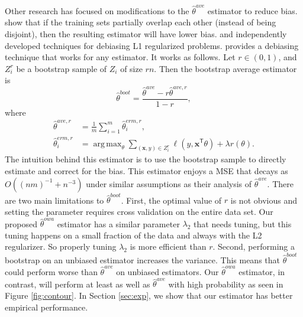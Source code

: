 \documentclass[twoside]{article}
\DeclareMathOperator*{\argmin}{arg\,min}
\DeclareMathOperator*{\argmax}{arg\,max}
\newcommand{\x}{\mathbf{x}}
\newcommand{\w}{\theta}
\newcommand{\wowa}{\hat\w^{owa}}
\newcommand{\wave}{\hat\w^{ave}}
\newcommand{\waver}{\hat\w^{ave,r}}
\newcommand{\wboot}{\hat\w^{boot}}
\newcommand{\wmle}{\hat\w^{erm}}
\newcommand{\wmler}{\hat\w^{erm,r}}
\newcommand{\reg}{r}
\newcommand{\loss}{\ell}
\newcommand{\trans}[1]{\ensuremath{{#1}^{\mathsf{T}}}}
\newcommand{\ltwo}[1]{{\lVert {#1} \rVert}}
\begin{document}
Other research has focused on modifications to the $\wave$ estimator to reduce bias.
\citet{zinkevich2010parallelized} show that if the training sets partially overlap each other (instead of being disjoint), then the resulting estimator will have lower bias.
\citet{lee2015communication} and \citet{battey2015distributed} independently developed techniques for debiasing L1 regularized problems.
\citet{zhang2012communication} provides a debiasing technique that works for any estimator.
It works as follows.
Let $r\in(0,1)$, and $Z_i^r$ be a bootstrap sample of $Z_i$ of size $rn$.
Then the bootstrap average estimator is
\begin{equation}
\wboot = \frac{\wave-r\waver}{1-r}
,
\end{equation}
where
\begin{equation}
\begin{aligned}
\waver &= \frac{1}{m}\sum_{i=1}^m \wmler_i
,
\\
\wmler_i &= \argmax_\w \sum_{(\x,y)\in Z_i^r} \loss(y,\trans\x\w) + \lambda \reg(\w)
.
\end{aligned}
\end{equation}
The intuition behind this estimator is to use the bootstrap sample to directly estimate and correct for the bias.
This estimator enjoys a MSE that decays as $O((nm)^{-1}+n^{-3})$ under similar assumptions as their analysis of $\wave$.
There are two main limitations to $\wboot$.
First, the optimal value of $r$ is not obvious and setting the parameter requires cross validation on the entire data set.
Our proposed $\wowa$ estimator has a similar parameter $\lambda_2$ that needs tuning,
but this tuning happens on a small fraction of the data and always with the L2 regularizer.
So properly tuning $\lambda_2$ is more efficient than $r$.
Second, performing a bootstrap on an unbiased estimator increases the variance.
This means that $\wboot$ could perform worse than $\wave$ on unbiased estimators.
Our $\wowa$ estimator, in contrast, will perform at least as well as $\wave$ with high probability as seen in Figure \ref{fig:contour}.
In Section \ref{sec:exp}, we show that our estimator has better empirical performance.

\end{document}
